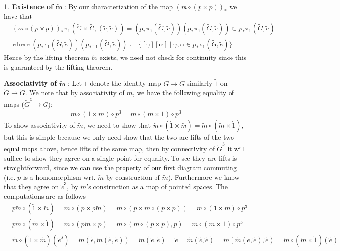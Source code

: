 \documentclass[10.5pt]{article}
\theoremstyle{definition}
\newtheorem{pb}{}
\newcommand{\set}[1]{\{#1\}}
\begin{document}
\begin{pb}
        \textbf{Existence of }\(\mathbf{\tilde{m}}\) : By our characterization of the map \((m \circ (p\times p))_*\) we have that 
        \begin{align*}
            &(m \circ (p\times p))_*\pi_1(\tilde{G}\times\tilde{G},(\tilde{e},\tilde{e})) = (p_*\pi_1(\tilde{G},\tilde{e}))(p_*\pi_1(\tilde{G},\tilde{e})) \subset p_*\pi_1(\tilde{G},\tilde{e}) \\
            &\text{where } (p_*\pi_1(\tilde{G},\tilde{e}))(p_*\pi_1(\tilde{G},\tilde{e})) := \set{[\gamma][\alpha]\;\vert \; \gamma, \alpha \in p_*\pi_1(\tilde{G},\tilde{e})}
        \end{align*}
        Hence by the lifting theorem \(\tilde{m}\) exists, we need not check for continuity since this is guaranteed by the lifting theorem.

        \textbf{Associativity of} \(\mathbf{\tilde{m}}\) : Let \(1\) denote the identity map \(G \to G\) similarly \(\tilde{1}\) on \(\tilde{G} \to \tilde{G}\). We note that by associativity of \(m\), we have the following equality of maps (\(\tilde{G}^3 \to G\)):
        \begin{align*}
            m \circ (1 \times m) \circ p^3 = m \circ (m \times 1) \circ p^3
        \end{align*}
        To show associativity of \(\tilde{m}\), we need to show that \(\tilde{m} \circ (\tilde{1} \times \tilde{m}) = \tilde{m} \circ (\tilde{m} \times \tilde{1})\), but this is simple because we only need show that the two are lifts of the two equal maps above, hence lifts of the same map, then by connectivity of \(\tilde{G}^3\) it will suffice to show they agree on a single point for equality. To see they are lifts is straightforward, since we can use the property of our first diagram commuting (i.e. \(p\) is a homomorphism wrt. \(\tilde{m}\) by construction of \(\tilde{m}\)). Furthermore we know that they agree on \(\tilde{e}^3\), by \(\tilde{m}\)'s construction as a map of pointed spaces. The computations are as follows
        \begin{align*}
            &p\tilde{m} \circ (\tilde{1} \times \tilde{m}) = m \circ (p \times p\tilde{m})
            = m \circ (p \times m\circ(p \times p)) = m \circ (1 \times m) \circ p^3 \\
            &p\tilde{m} \circ (\tilde{m} \times \tilde{1}) = m \circ(p\tilde{m}\times p) = m \circ (m \circ (p \times p),p) = m \circ (m \times 1) \circ p^3\\
            &\tilde{m} \circ (\tilde{1} \times \tilde{m})(\tilde{e}^3) = \tilde{m}(\tilde{e},\tilde{m}(\tilde{e},\tilde{e})) = \tilde{m}(\tilde{e},\tilde{e}) = \tilde{e} = \tilde{m}(\tilde{e},\tilde{e}) = \tilde{m}(\tilde{m}(\tilde{e},\tilde{e}),\tilde{e}) = \tilde{m}\circ(\tilde{m} \times \tilde{1})(\tilde{e})
        \end{align*}
        

\end{pb}
\end{document}
